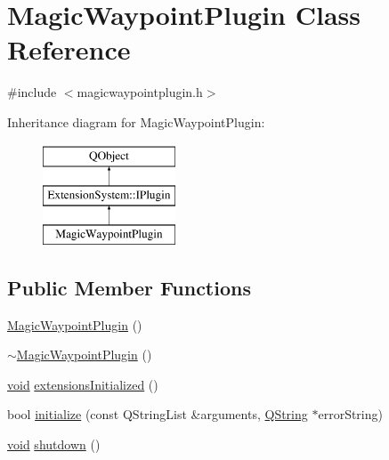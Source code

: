 \hypertarget{class_magic_waypoint_plugin}{\section{Magic\-Waypoint\-Plugin Class Reference}
\label{class_magic_waypoint_plugin}
}


{\ttfamily \#include $<$magicwaypointplugin.\-h$>$}

Inheritance diagram for Magic\-Waypoint\-Plugin\-:\begin{figure}[H]
\begin{center}
\leavevmode
\includegraphics[height=3.000000cm]{class_magic_waypoint_plugin}
\end{center}
\end{figure}
\subsection*{Public Member Functions}
\begin{DoxyCompactItemize}
\item 
\hyperlink{group___g_c_s_control_gadget_plugin_ga89fc30c92d7ea9574134d87f7378a2b6}{Magic\-Waypoint\-Plugin} ()
\item 
\hyperlink{group___g_c_s_control_gadget_plugin_ga4f66f5fe1f496bc719c7ca504b944579}{$\sim$\-Magic\-Waypoint\-Plugin} ()
\item 
\hyperlink{group___u_a_v_objects_plugin_ga444cf2ff3f0ecbe028adce838d373f5c}{void} \hyperlink{group___g_c_s_control_gadget_plugin_gaf45230b46b95ad6f1a8f74dc1023b94a}{extensions\-Initialized} ()
\item 
bool \hyperlink{group___g_c_s_control_gadget_plugin_ga2c2d28520438e765c6e3ba288777e894}{initialize} (const Q\-String\-List \&arguments, \hyperlink{group___u_a_v_objects_plugin_gab9d252f49c333c94a72f97ce3105a32d}{Q\-String} $\ast$error\-String)
\item 
\hyperlink{group___u_a_v_objects_plugin_ga444cf2ff3f0ecbe028adce838d373f5c}{void} \hyperlink{group___g_c_s_control_gadget_plugin_gaa9be91fd32c41e37bfdbd77c2420373f}{shutdown} ()
\end{DoxyCompactItemize}


